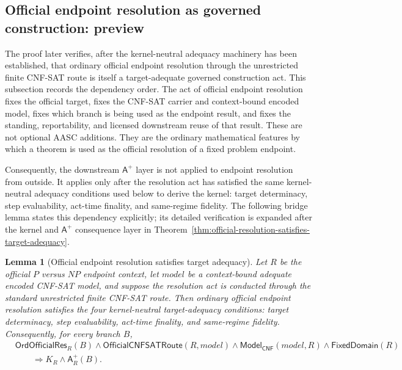 \documentclass[11pt]{article}
\newtheorem{lemma}[theorem]{Lemma}
\theoremstyle{definition}
\theoremstyle{remark}
\newcommand{\Aplus}{\mathsf{A}^{+}}
\newcommand{\FixedDom}{\mathsf{FixedDomain}}
\newcommand{\ModelOfCnf}{\mathsf{Model}_{\mathsf{CNF}}}
\newcommand{\OrdOfficialRes}{\mathsf{OrdOfficialRes}}
\newcommand{\OfficialCNFSATRoute}{\mathsf{OfficialCNFSATRoute}}
\begin{document}
\subsection{Official endpoint resolution as governed construction: preview}\label{subsec:official-resolution-preview}
The proof later verifies, after the kernel-neutral adequacy machinery has been established, that ordinary official endpoint resolution through the unrestricted finite CNF-SAT route is itself a target-adequate governed construction act. This subsection records the dependency order. The act of official endpoint resolution fixes the official target, fixes the CNF-SAT carrier and context-bound encoded model, fixes which branch is being used as the endpoint result, and fixes the standing, reportability, and licensed downstream reuse of that result. These are not optional AASC additions. They are the ordinary mathematical features by which a theorem is used as the official resolution of a fixed problem endpoint.

Consequently, the downstream \(\Aplus\) layer is not applied to endpoint resolution from outside. It applies only after the resolution act has satisfied the same kernel-neutral adequacy conditions used below to derive the kernel: target determinacy, step evaluability, act-time finality, and same-regime fidelity. The following bridge lemma states this dependency explicitly; its detailed verification is expanded after the kernel and \(\Aplus\) consequence layer in Theorem~\ref{thm:official-resolution-satisfies-target-adequacy}.

\begin{lemma}[Official endpoint resolution satisfies target adequacy]\label{lem:front-official-resolution-target-adequacy}
Let \(R\) be the official \(P\) versus \(NP\) endpoint context, let \(model\) be a context-bound adequate encoded CNF-SAT model, and suppose the resolution act is conducted through the standard unrestricted finite CNF-SAT route. Then ordinary official endpoint resolution satisfies the four kernel-neutral target-adequacy conditions: target determinacy, step evaluability, act-time finality, and same-regime fidelity. Consequently, for every branch \(B\),
\[
\begin{aligned}
  &\OrdOfficialRes_R(B)\wedge\OfficialCNFSATRoute(R,model)
  \wedge\ModelOfCnf(model,R)\wedge\FixedDom(R)\\
  &\qquad\Rightarrow K_R\wedge\Aplus_R(B).
\end{aligned}
\]
\end{lemma}
\end{document}
